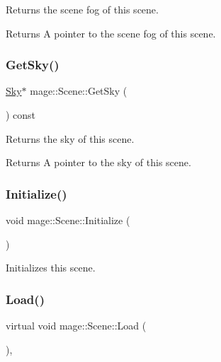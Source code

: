 Returns the scene fog of this scene.

\begin{DoxyReturn}{Returns}
A pointer to the scene fog of this scene. 
\end{DoxyReturn}
\hypertarget{classmage_1_1_scene_afecf68ec8c48d4c28082f99d8042e700}{}\label{classmage_1_1_scene_afecf68ec8c48d4c28082f99d8042e700} 
\subsubsection{\texorpdfstring{Get\+Sky()}{GetSky()}}
{\footnotesize\ttfamily \hyperlink{classmage_1_1_sky}{Sky}$\ast$ mage\+::\+Scene\+::\+Get\+Sky (\begin{DoxyParamCaption}{ }\end{DoxyParamCaption}) const\hspace{0.3cm}{\ttfamily [noexcept]}}

Returns the sky of this scene.

\begin{DoxyReturn}{Returns}
A pointer to the sky of this scene. 
\end{DoxyReturn}
\hypertarget{classmage_1_1_scene_a3cd12ef381ca743bf0b8f8aa2a76eb57}{}\label{classmage_1_1_scene_a3cd12ef381ca743bf0b8f8aa2a76eb57} 
\subsubsection{\texorpdfstring{Initialize()}{Initialize()}}
{\footnotesize\ttfamily void mage\+::\+Scene\+::\+Initialize (\begin{DoxyParamCaption}{ }\end{DoxyParamCaption})}

Initializes this scene. \hypertarget{classmage_1_1_scene_a1fb4a93eaa2f6a9e20594e205abb9a32}{}\label{classmage_1_1_scene_a1fb4a93eaa2f6a9e20594e205abb9a32} 
\subsubsection{\texorpdfstring{Load()}{Load()}}
{\footnotesize\ttfamily virtual void mage\+::\+Scene\+::\+Load (\begin{DoxyParamCaption}{ }\end{DoxyParamCaption})\hspace{0.3cm}{\ttfamily [private]}, {\ttfamily [virtual]}}

